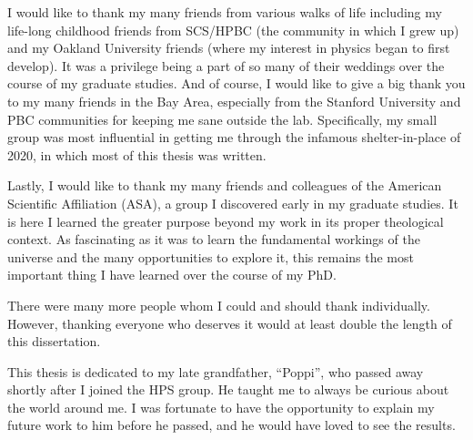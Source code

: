 \documentclass{report}
\begin{document}
I would like to thank my many friends from various walks of life including my life-long childhood friends from SCS/HPBC (the community in which I grew up) and my Oakland University friends (where my interest in physics began to first develop). It was a privilege being a part of so many of their weddings over the course of my graduate studies. And of course, I would like to give a big thank you to my many friends in the Bay Area, especially from the Stanford University and PBC communities for keeping me sane outside the lab. Specifically, my small group was most influential in getting me through the infamous shelter-in-place of 2020, in which most of this thesis was written.

Lastly, I would like to thank my many friends and colleagues of the American Scientific Affiliation (ASA), a group I discovered early in my graduate studies. It is here I learned the greater purpose beyond my work in its proper theological context. As fascinating as it was to learn the fundamental workings of the universe and the many opportunities to explore it, this remains the most important thing I have learned over the course of my PhD.

There were many more people whom I could and should thank individually. However, thanking everyone who deserves it would at least double the length of this dissertation.

\clearpage

This thesis is dedicated to my late grandfather, ``Poppi'', who passed away shortly after I joined the HPS group. He taught me to always be curious about the world around me. I was fortunate to have the opportunity to explain my future work to him before he passed, and he would have loved to see the results.

\afterpreface










\appendix



%

\end{document}
